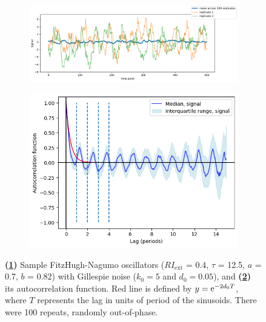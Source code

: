 \begin{figure}[hb!]
  \centering
  \begin{subfigure}[t]{0.6\textwidth}
  \centering
    \includegraphics[width=\linewidth]{fhn_meanplot}
    \caption{
    }
    \label{fig:acf-fhn-gillnoise-ts}
  \end{subfigure}%
  \begin{subfigure}[t]{0.4\textwidth}
  \centering
    \includegraphics[width=\linewidth]{fhn_acf}
    \caption{
    }
    \label{fig:acf-fhn-gillnoise-acf}
  \end{subfigure}

  \caption[
    Sample FitzHugh-Nagumo oscillators with Gillespie noise, and
    its autocorrelation function.
  ]{
    \textbf{(\ref{fig:acf-fhn-gillnoise-ts})} Sample FitzHugh-Nagumo oscillators ($RI_{\mathrm{ext}}$ = 0.4, $\tau$ = 12.5, $a$ = 0.7, $b$ = 0.82) with Gillespie noise ($k_{0} = 5$ and $d_{0} = 0.05$), and
    \textbf{(\ref{fig:acf-fhn-gillnoise-acf})} its autocorrelation function.
    Red line is defined by $y = \mathrm{e}^{-2d_{0}T}$, where $T$ represents the lag in units of period of the sinusoids.
    There were 100 repeats, randomly out-of-phase.
  }
  \label{fig:acf-fhn}
\end{figure}


